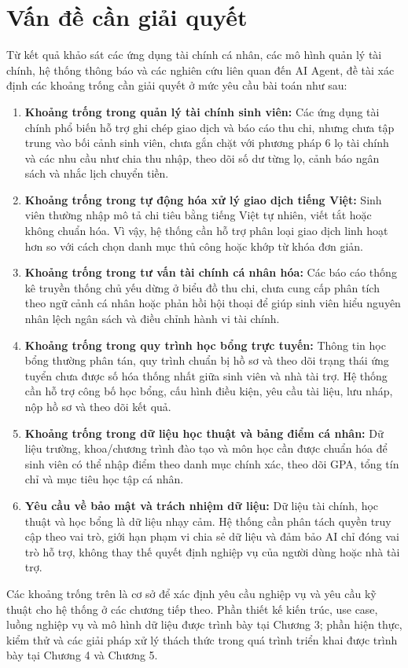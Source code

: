 \section{Vấn đề cần giải quyết}
Từ kết quả khảo sát các ứng dụng tài chính cá nhân, các mô hình quản lý tài chính, hệ thống thông báo và các nghiên cứu liên quan đến AI Agent, đề tài xác định các khoảng trống cần giải quyết ở mức yêu cầu bài toán như sau:
\begin{enumerate}
    \item \textbf{Khoảng trống trong quản lý tài chính sinh viên:} Các ứng dụng tài chính phổ biến hỗ trợ ghi chép giao dịch và báo cáo thu chi, nhưng chưa tập trung vào bối cảnh sinh viên, chưa gắn chặt với phương pháp 6 lọ tài chính và các nhu cầu như chia thu nhập, theo dõi số dư từng lọ, cảnh báo ngân sách và nhắc lịch chuyển tiền.
    \item \textbf{Khoảng trống trong tự động hóa xử lý giao dịch tiếng Việt:} Sinh viên thường nhập mô tả chi tiêu bằng tiếng Việt tự nhiên, viết tắt hoặc không chuẩn hóa. Vì vậy, hệ thống cần hỗ trợ phân loại giao dịch linh hoạt hơn so với cách chọn danh mục thủ công hoặc khớp từ khóa đơn giản.
    \item \textbf{Khoảng trống trong tư vấn tài chính cá nhân hóa:} Các báo cáo thống kê truyền thống chủ yếu dừng ở biểu đồ thu chi, chưa cung cấp phân tích theo ngữ cảnh cá nhân hoặc phản hồi hội thoại để giúp sinh viên hiểu nguyên nhân lệch ngân sách và điều chỉnh hành vi tài chính.
    \item \textbf{Khoảng trống trong quy trình học bổng trực tuyến:} Thông tin học bổng thường phân tán, quy trình chuẩn bị hồ sơ và theo dõi trạng thái ứng tuyển chưa được số hóa thống nhất giữa sinh viên và nhà tài trợ. Hệ thống cần hỗ trợ công bố học bổng, cấu hình điều kiện, yêu cầu tài liệu, lưu nháp, nộp hồ sơ và theo dõi kết quả.
    \item \textbf{Khoảng trống trong dữ liệu học thuật và bảng điểm cá nhân:} Dữ liệu trường, khoa/chương trình đào tạo và môn học cần được chuẩn hóa để sinh viên có thể nhập điểm theo danh mục chính xác, theo dõi GPA, tổng tín chỉ và mục tiêu học tập cá nhân.
    \item \textbf{Yêu cầu về bảo mật và trách nhiệm dữ liệu:} Dữ liệu tài chính, học thuật và học bổng là dữ liệu nhạy cảm. Hệ thống cần phân tách quyền truy cập theo vai trò, giới hạn phạm vi chia sẻ dữ liệu và đảm bảo AI chỉ đóng vai trò hỗ trợ, không thay thế quyết định nghiệp vụ của người dùng hoặc nhà tài trợ.
\end{enumerate}

Các khoảng trống trên là cơ sở để xác định yêu cầu nghiệp vụ và yêu cầu kỹ thuật cho hệ thống ở các chương tiếp theo. Phần thiết kế kiến trúc, use case, luồng nghiệp vụ và mô hình dữ liệu được trình bày tại Chương 3; phần hiện thực, kiểm thử và các giải pháp xử lý thách thức trong quá trình triển khai được trình bày tại Chương 4 và Chương 5.
